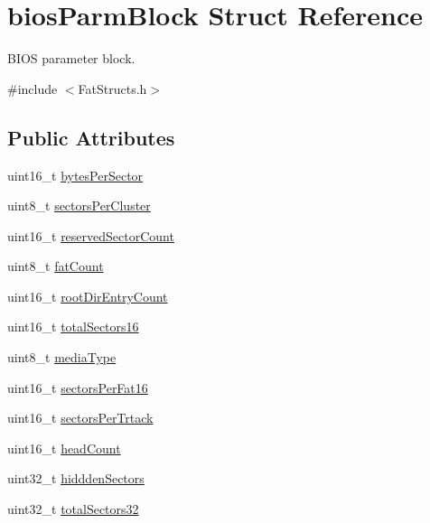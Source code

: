 \hypertarget{structbios_parm_block}{}\section{bios\+Parm\+Block Struct Reference}
\label{structbios_parm_block}


B\+I\+OS parameter block.  




{\ttfamily \#include $<$Fat\+Structs.\+h$>$}

\subsection*{Public Attributes}
\begin{DoxyCompactItemize}
\item 
uint16\+\_\+t \hyperlink{structbios_parm_block_aec24d316af486445d55da14cbbfa6bf4}{bytes\+Per\+Sector}
\item 
uint8\+\_\+t \hyperlink{structbios_parm_block_a45d5e2d8c93a028a074e8ce3dc751ab5}{sectors\+Per\+Cluster}
\item 
uint16\+\_\+t \hyperlink{structbios_parm_block_adb4830c345b27293c7d7b97b77f52e01}{reserved\+Sector\+Count}
\item 
uint8\+\_\+t \hyperlink{structbios_parm_block_a7c03f147c3fb18f0df03d346050af13b}{fat\+Count}
\item 
uint16\+\_\+t \hyperlink{structbios_parm_block_a9a1b24bb2dbb3a123c4ffc703954d71d}{root\+Dir\+Entry\+Count}
\item 
uint16\+\_\+t \hyperlink{structbios_parm_block_a686c686fde2fb109bea120f2f434db87}{total\+Sectors16}
\item 
uint8\+\_\+t \hyperlink{structbios_parm_block_a4237e7c3ba247516d546c149954e5042}{media\+Type}
\item 
uint16\+\_\+t \hyperlink{structbios_parm_block_a24d6e5a9069491d5db6dbe747336985b}{sectors\+Per\+Fat16}
\item 
uint16\+\_\+t \hyperlink{structbios_parm_block_a7c27cb7f66c2c9d5266d896e8df227c7}{sectors\+Per\+Trtack}
\item 
uint16\+\_\+t \hyperlink{structbios_parm_block_a2324ca82e2a7da4d91f458fa32a6e239}{head\+Count}
\item 
uint32\+\_\+t \hyperlink{structbios_parm_block_a9413199be8525190d40589f60c22bcab}{hiddden\+Sectors}
\item 
uint32\+\_\+t \hyperlink{structbios_parm_block_abead42e130c40e2aa535202e7cb07578}{total\+Sectors32}
\item 

\end{DoxyCompactItemize}
